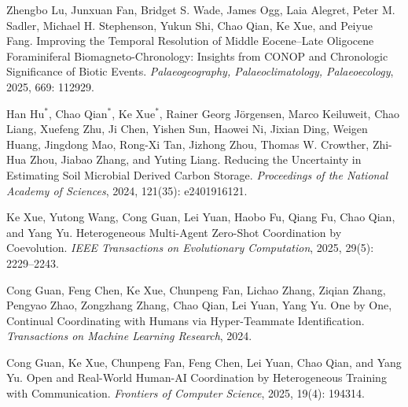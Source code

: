 \documentclass[10pt,a4paper,fontset=fandol]{ctexart}
\begin{document}
\begin{cvbullet}
  \item Zhengbo Lu, Junxuan Fan, Bridget S. Wade, James Ogg, Laia Alegret, Peter M. Sadler, Michael H. Stephenson, Yukun Shi, Chao Qian, Ke Xue, and Peiyue Fang. Improving the Temporal Resolution of Middle Eocene--Late Oligocene Foraminiferal Biomagneto-Chronology: Insights from CONOP and Chronologic Significance of Biotic Events. \textit{Palaeogeography, Palaeoclimatology, Palaeoecology}, 2025, 669: 112929.
  \item Han Hu$^*$, Chao Qian$^*$, Ke Xue$^*$, Rainer Georg Jörgensen, Marco Keiluweit, Chao Liang, Xuefeng Zhu, Ji Chen, Yishen Sun, Haowei Ni, Jixian Ding, Weigen Huang, Jingdong Mao, Rong-Xi Tan, Jizhong Zhou, Thomas W. Crowther, Zhi-Hua Zhou, Jiabao Zhang, and Yuting Liang. Reducing the Uncertainty in Estimating Soil Microbial Derived Carbon Storage. \textit{Proceedings of the National Academy of Sciences}, 2024, 121(35): e2401916121.
  \item Ke Xue, Yutong Wang, Cong Guan, Lei Yuan, Haobo Fu, Qiang Fu, Chao Qian, and Yang Yu. Heterogeneous Multi-Agent Zero-Shot Coordination by Coevolution. \textit{IEEE Transactions on Evolutionary Computation}, 2025, 29(5): 2229--2243.
  \item Cong Guan, Feng Chen, Ke Xue, Chunpeng Fan, Lichao Zhang, Ziqian Zhang, Pengyao Zhao, Zongzhang Zhang, Chao Qian, Lei Yuan, Yang Yu. One by One, Continual Coordinating with Humans via Hyper-Teammate Identification. \textit{Transactions on Machine Learning Research}, 2024.
  \item Cong Guan, Ke Xue, Chunpeng Fan, Feng Chen, Lei Yuan, Chao Qian, and Yang Yu. Open and Real-World Human-AI Coordination by Heterogeneous Training with Communication. \textit{Frontiers of Computer Science}, 2025, 19(4): 194314.
\end{cvbullet}
\end{document}
